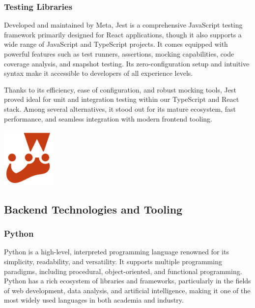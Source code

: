 \subsubsection{Testing Libraries}
Developed and maintained by Meta, Jest is a comprehensive JavaScript testing framework primarily designed for React applications, though it also supports a wide range of JavaScript and TypeScript projects. It comes equipped with powerful features such as test runners, assertions, mocking capabilities, code coverage analysis, and snapshot testing. Its zero-configuration setup and intuitive syntax make it accessible to developers of all experience levels.\mynewline

Thanks to its efficiency, ease of configuration, and robust mocking tools, Jest proved ideal for unit and integration testing within our TypeScript and React stack. Among several alternatives, it stood out for its mature ecosystem, fast performance, and seamless integration with modern frontend tooling.

\begin{center}
    \centering
    \includegraphics[width=0.2\textwidth]{Images/Jest Logo.png}
     \cite{jest_logo}
    \label{fig:jest_logo}
\end{center}

\subsection{Backend Technologies and Tooling}

\subsubsection{Python}
Python is a high-level, interpreted programming language renowned for its simplicity, readability, and versatility. It supports multiple programming paradigms, including procedural, object-oriented, and functional programming. Python has a rich ecosystem of libraries and frameworks, particularly in the fields of web development, data analysis, and artificial intelligence, making it one of the most widely used languages in both academia and industry.\mynewline

